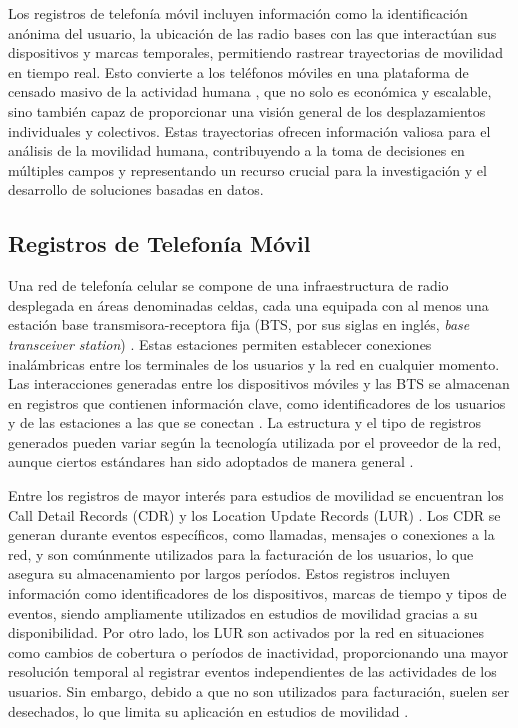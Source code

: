 Los registros de telefonía móvil incluyen información como la identificación anónima del usuario, la ubicación de las radio bases con las que interactúan sus dispositivos y marcas temporales, permitiendo rastrear trayectorias de movilidad en tiempo real. Esto convierte a los teléfonos móviles en una plataforma de censado masivo de la actividad humana \cite{doyle2014population}, que no solo es económica y escalable, sino también capaz de proporcionar una visión general de los desplazamientos individuales y colectivos. Estas trayectorias ofrecen información valiosa para el análisis de la movilidad humana, contribuyendo a la toma de decisiones en múltiples campos y representando un recurso crucial para la investigación y el desarrollo de soluciones basadas en datos.

\subsection*{Registros de Telefonía Móvil}

Una red de telefonía celular se compone de una infraestructura de radio desplegada en áreas denominadas celdas, cada una equipada con al menos una estación base transmisora-receptora fija (BTS, por sus siglas en inglés, \textit{base transceiver station}) \cite{sharma2012cell}. Estas estaciones permiten establecer conexiones inalámbricas entre los terminales de los usuarios y la red en cualquier momento. Las interacciones generadas entre los dispositivos móviles y las BTS se almacenan en registros que contienen información clave, como identificadores de los usuarios y de las estaciones a las que se conectan \cite{yuan2013characterizing}. La estructura y el tipo de registros generados pueden variar según la tecnología utilizada por el proveedor de la red, aunque ciertos estándares han sido adoptados de manera general \cite{durive2021sistema}.

Entre los registros de mayor interés para estudios de movilidad se encuentran los Call Detail Records (CDR) y los Location Update Records (LUR) \cite{gutierrez2020como}. Los CDR se generan durante eventos específicos, como llamadas, mensajes o conexiones a la red, y son comúnmente utilizados para la facturación de los usuarios, lo que asegura su almacenamiento por largos períodos. Estos registros incluyen información como identificadores de los dispositivos, marcas de tiempo y tipos de eventos, siendo ampliamente utilizados en estudios de movilidad gracias a su disponibilidad. Por otro lado, los LUR son activados por la red en situaciones como cambios de cobertura o períodos de inactividad, proporcionando una mayor resolución temporal al registrar eventos independientes de las actividades de los usuarios. Sin embargo, debido a que no son utilizados para facturación, suelen ser desechados, lo que limita su aplicación en estudios de movilidad \cite{durive2021sistema}.

